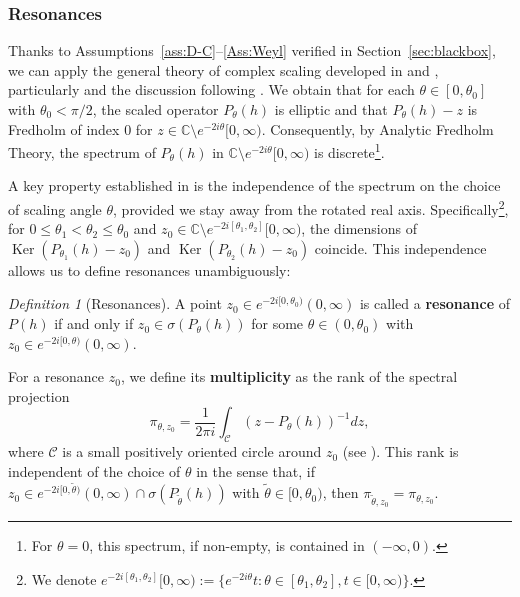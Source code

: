 \documentclass[11pt]{amsart}
\theoremstyle{remark}
\newtheorem{definition}[theorem]{Definition}
\numberwithin{equation}{section}
\begin{document}
\subsubsection{Resonances}

Thanks to Assumptions~\ref{ass:D-C}--\ref{Ass:Weyl} verified in Section~\ref{sec:blackbox}, we can apply the general theory of complex scaling developed in \cite{SZ} and \cite[Section 5]{S}, particularly \cite[Lemma 5.1]{S} and the discussion following \cite[(5.8)]{S}. We obtain that for each $\theta \in [0,\theta_0]$ with $\theta_0 < \pi/2$, the scaled operator $P_\theta(h)$ is elliptic and that $P_\theta(h)-z$ is Fredholm of index $0$ for $z \in \mathbb{C} \setminus e^{-2i\theta}[0,\infty)$.  Consequently, by Analytic Fredholm Theory, the spectrum of $P_\theta(h)$ in $\mathbb{C} \setminus e^{-2i\theta}[0,\infty)$ is discrete\footnote{For $\theta=0$, this spectrum, if non-empty, is contained in $(-\infty,0)$.}.

A key property established in \cite[Lemma 5.2]{S} is the independence of the spectrum on the choice of scaling angle $\theta$, provided we stay away from the rotated real axis. Specifically\footnote{We denote $e^{-2i[\theta_1,\theta_2]}[0,\infty):=\{ e^{-2i\theta}t : \theta \in [\theta_1, \theta_2], t \in [0, \infty) \}$.}, for $0 \leq \theta_1 < \theta_2 \le \theta_0$ and $z_0 \in \mathbb{C} \setminus e^{-2i[\theta_1,\theta_2]}[0,\infty)$, the dimensions of $\operatorname{Ker}(P_{\theta_1}(h) - z_0)$ and $\operatorname{Ker}(P_{\theta_2}(h) - z_0)$ coincide. 
This independence allows us to define resonances unambiguously:

\begin{definition}[Resonances]\label{def:resonances}
A point $z_0 \in e^{-2i[0,\theta_0)}(0,\infty)$ is called a \textbf{resonance} of $P(h)$ if and only if $z_0 \in \sigma(P_\theta(h))$ for some  $\theta \in (0,\theta_0)$ with $z_0 \in e^{-2i[0,\theta)}(0,\infty)$.
\end{definition}


For a resonance $z_0$, we define its \textbf{multiplicity} as the rank of the spectral projection
\[
\pi_{\theta,z_0} = \frac{1}{2\pi i} \int_{\mathcal C} (z - P_\theta(h))^{-1} dz,
\]
where $\mathcal C$ is a small positively oriented circle around $z_0$ (see \cite[(5.12)]{S}). This rank is independent of the choice of $\theta$ in the sense that, if $z_0\in e^{-2i[0,\tilde\theta)}(0,\infty)\cap\sigma(P_{\tilde\theta}(h))$ with $\tilde\theta\in[0,\theta_0)$, then $\pi_{\tilde\theta,z_0}=\pi_{\theta,z_0}$.
\end{document}
